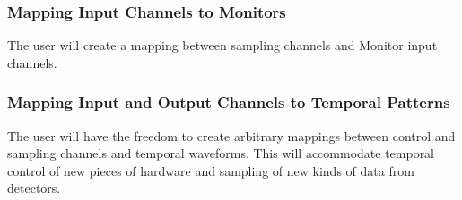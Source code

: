 \documentclass[a4paper,12pt]{article}
\begin{document}
\subsubsection{Mapping Input Channels to Monitors}
The user will create a mapping between sampling channels and Monitor
input channels.
\subsubsection{Mapping Input and Output Channels to Temporal Patterns}
The user will have the freedom to create arbitrary mappings between
control and sampling channels and temporal waveforms. This will accommodate
temporal control of new pieces of hardware and sampling of new kinds
of data from detectors.
\end{document}
